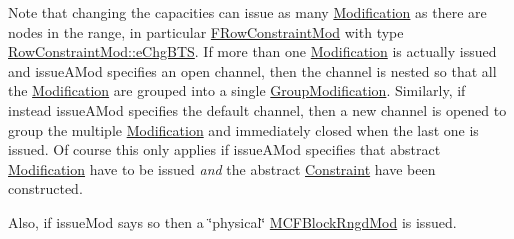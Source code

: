 Note that changing the capacities can issue as many \mbox{\hyperlink{class_s_m_spp__di__unipi__it_1_1_modification}{Modification}} as there are nodes in the range, in particular \mbox{\hyperlink{class_s_m_spp__di__unipi__it_1_1_f_row_constraint_mod}{F\+Row\+Constraint\+Mod}} with type \mbox{\hyperlink{class_s_m_spp__di__unipi__it_1_1_row_constraint_mod_af91e41a206e988d55a31347acd6f5d33a555ab61cc2e0ed36251cba947d2beccd}{Row\+Constraint\+Mod\+::e\+Chg\+B\+TS}}. If more than one \mbox{\hyperlink{class_s_m_spp__di__unipi__it_1_1_modification}{Modification}} is actually issued and issue\+A\+Mod specifies an open channel, then the channel is nested so that all the \mbox{\hyperlink{class_s_m_spp__di__unipi__it_1_1_modification}{Modification}} are grouped into a single \mbox{\hyperlink{class_s_m_spp__di__unipi__it_1_1_group_modification}{Group\+Modification}}. Similarly, if instead issue\+A\+Mod specifies the default channel, then a new channel is opened to group the multiple \mbox{\hyperlink{class_s_m_spp__di__unipi__it_1_1_modification}{Modification}} and immediately closed when the last one is issued. Of course this only applies if issue\+A\+Mod specifies that abstract \mbox{\hyperlink{class_s_m_spp__di__unipi__it_1_1_modification}{Modification}} have to be issued {\itshape and} the abstract \mbox{\hyperlink{class_s_m_spp__di__unipi__it_1_1_constraint}{Constraint}} have been constructed.

Also, if issue\+Mod says so then a \char`\"{}physical\char`\"{} \mbox{\hyperlink{class_s_m_spp__di__unipi__it_1_1_m_c_f_block_rngd_mod}{M\+C\+F\+Block\+Rngd\+Mod}} is issued. \mbox{\label{class_s_m_spp__di__unipi__it_1_1_m_c_f_block_a68732575daf2a3d3e2601ca4f5742f39}} 
